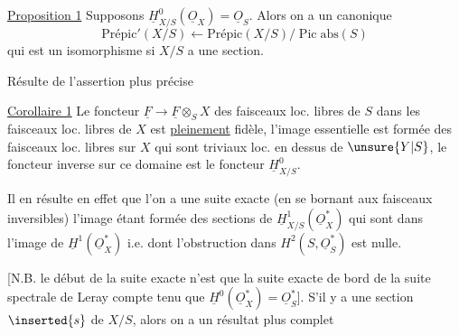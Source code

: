 \uline{Proposition 1} Supposons $\underline H^0_{X/S}(\underline O_X)=\underline O_S$. Alors on a un  canonique
\[
\mathrm{Prépic}'(X/S)\longleftarrow\mathrm{Prépic}(X/S)/\operatorname{Pic}\mathrm{abs}(S)
\]
qui est un isomorphisme si $X/S$ a une section.

Résulte de l'assertion plus précise

\uline{Corollaire 1} Le foncteur $\underline F\to\underline F\otimes_S X$ des faisceaux loc. libres de $S$ dans les faisceaux loc. libres de $X$  est \uline{pleinement} fidèle, l'image essentielle est formée des faisceaux loc. libres sur $X$ qui sont triviaux loc. en dessus de $\unsure{Y|S}$, le foncteur inverse sur ce domaine est le foncteur $\underline H^0_{X/S}$.

Il en résulte en effet que l'on a une suite exacte (en se bornant aux faisceaux inversibles)
l'image  étant formée des sections de $\underline H^1_{X/S}(\underline O_X^*)$ qui sont dans l'image de $\underline H^1(\underline O_X^*)$ i.e. dont l'obstruction dans $H^2(S,\underline O_S^*)$ est nulle.

[N.B. le début de la suite exacte n'est que la suite exacte de bord de la suite spectrale de Leray
compte tenu que $\underline H^0(\underline O_X^*)=\underline O_S^*$]. S'il y a une section $\inserted{s}$ de $X/S$, alors on  a un résultat plus complet

